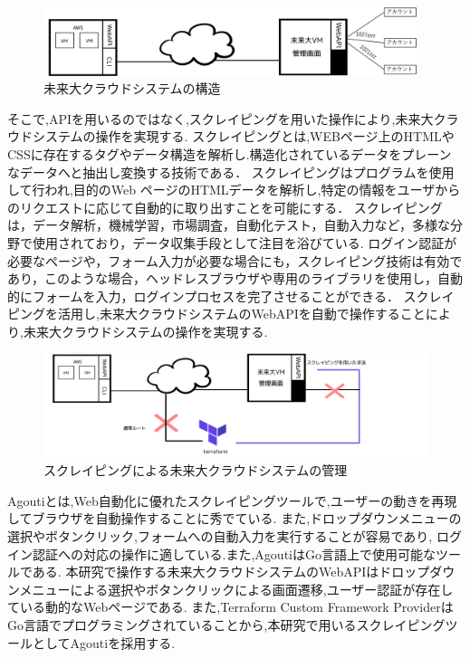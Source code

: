 \documentclass[11pt]{ujarticle}\sloppy
\begin{document}
\begin{figure}[h]
	\includegraphics[width=1\linewidth,height=2cm]{./images/cloud.png}
	\caption{未来大クラウドシステムの構造}
  \label{fig:cloud}
\end{figure}


そこで,APIを用いるのではなく,スクレイピングを用いた操作により,未来大クラウドシステムの操作を実現する.
スクレイピングとは,WEBページ上のHTMLやCSSに存在するタグやデータ構造を解析し.構造化されているデータをプレーンなデータへと抽出し変換する技術である．
スクレイピングはプログラムを使用して行われ,目的のWeb ページのHTMLデータを解析し,特定の情報をユーザからのリクエストに応じて自動的に取り出すことを可能にする．
スクレイピングは，データ解析，機械学習，市場調査，自動化テスト，自動入力など，多様な分野で使用されており，データ収集手段として注目を浴びている.
ログイン認証が必要なページや，フォーム入力が必要な場合にも，スクレイピング技術は有効であり，このような場合，ヘッドレスブラウザや専用のライブラリを使用し，自動的にフォームを入力，ログインプロセスを完了させることができる．
スクレイピングを活用し,未来大クラウドシステムのWebAPIを自動で操作することにより,未来大クラウドシステムの操作を実現する.


\begin{figure}[h]
	\includegraphics[width=1\linewidth]{./images/scraping.png}
	\caption{スクレイピングによる未来大クラウドシステムの管理}
  \label{fig:scraping}
\end{figure}


Agoutiとは,Web自動化に優れたスクレイピングツールで,ユーザーの動きを再現してブラウザを自動操作することに秀でている.
また,ドロップダウンメニューの選択やボタンクリック,フォームへの自動入力を実行することが容易であり,
ログイン認証への対応の操作に適している.また,AgoutiはGo言語上で使用可能なツールである.
本研究で操作する未来大クラウドシステムのWebAPIはドロップダウンメニューによる選択やボタンクリックによる画面遷移,ユーザー認証が存在している動的なWebページである.
また,Terraform Custom Framework ProviderはGo言語でプログラミングされていることから,本研究で用いるスクレイピングツールとしてAgoutiを採用する.
\end{document}
